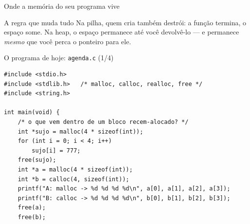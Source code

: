 \documentclass[aspectratio=169]{beamer}
\begin{document}
\begin{frame}{Onde a memória do seu programa vive}
  \begin{center}
  \end{center}
  \begin{block}{A regra que muda tudo}
    Na pilha, quem cria também destrói: a função termina, o espaço some.
    Na heap, o espaço permanece até você devolvê-lo --- e permanece
    \emph{mesmo} que você perca o ponteiro para ele.
  \end{block}
\end{frame}

\begin{frame}[fragile]{O programa de hoje: \texttt{agenda.c} (1/4)}
\begin{lstlisting}[basicstyle=\ttfamily\scriptsize]
#include <stdio.h>
#include <stdlib.h>   /* malloc, calloc, realloc, free */
#include <string.h>

int main(void) {
    /* o que vem dentro de um bloco recem-alocado? */
    int *sujo = malloc(4 * sizeof(int));
    for (int i = 0; i < 4; i++)
        sujo[i] = 777;
    free(sujo);
    int *a = malloc(4 * sizeof(int));
    int *b = calloc(4, sizeof(int));
    printf("A: malloc -> %d %d %d %d\n", a[0], a[1], a[2], a[3]);
    printf("B: calloc -> %d %d %d %d\n", b[0], b[1], b[2], b[3]);
    free(a);
    free(b);
\end{lstlisting}
\end{frame}
\end{document}
